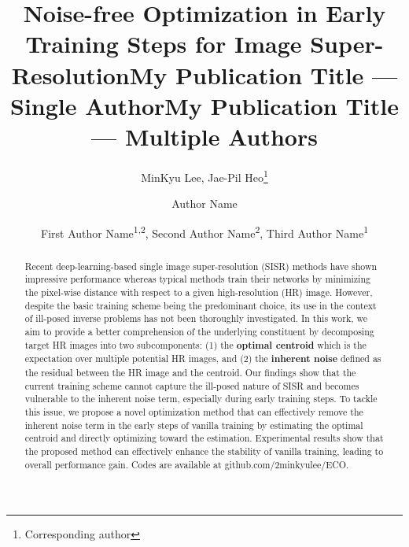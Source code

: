 \documentclass[letterpaper]{article} %
\title{Noise-free Optimization in Early Training Steps for Image Super-Resolution}
\author{
    MinKyu Lee,
    Jae-Pil Heo\thanks{Corresponding author}
}
\title{My Publication Title --- Single Author}
\author {
    Author Name
}
\title{My Publication Title --- Multiple Authors}
\author {
    First Author Name\textsuperscript{\rm 1,\rm 2},
    Second Author Name\textsuperscript{\rm 2},
    Third Author Name\textsuperscript{\rm 1}
}
\begin{document}
\maketitle


\begin{abstract}
%
Recent deep-learning-based single image super-resolution (SISR) methods have shown impressive performance whereas typical methods train their networks by minimizing the pixel-wise distance with respect to a given high-resolution (HR) image.
%
However, despite the basic training scheme being the predominant choice, its use in the context of ill-posed inverse problems has not been thoroughly investigated.
%
In this work, we aim to provide a better comprehension of the underlying constituent by decomposing target HR images into two subcomponents: (1) the \textbf{optimal centroid} which is the expectation over multiple potential HR images, and (2) the \textbf{inherent noise} defined as the residual between the HR image and the centroid.
%
Our findings show that the current training scheme cannot capture the ill-posed nature of SISR and becomes vulnerable to the inherent noise term, especially during early training steps. 
%
To tackle this issue, we propose a novel optimization method that can effectively remove the inherent noise term in the early steps of vanilla training by estimating the optimal centroid and directly optimizing toward the estimation.
% 
%
Experimental results show that the proposed method can effectively enhance the stability of vanilla training, leading to overall performance gain. Codes are available at github.com/2minkyulee/ECO.

\end{abstract}
\end{document}

